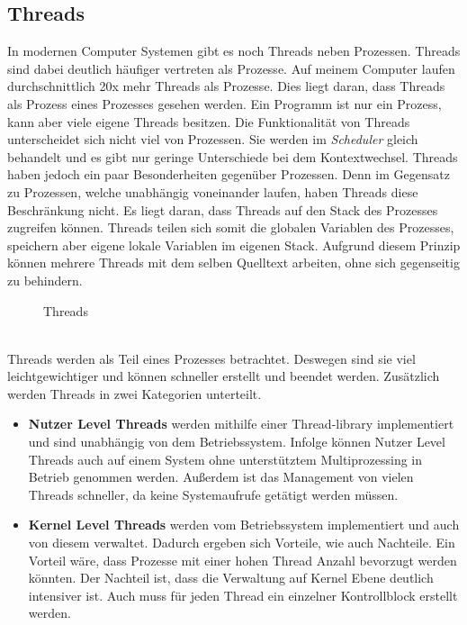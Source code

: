 \subsection{Threads}\label{Threads}
In modernen Computer Systemen gibt es noch Threads neben Prozessen. Threads sind dabei deutlich häufiger vertreten als Prozesse. Auf meinem Computer laufen durchschnittlich 20x mehr Threads als Prozesse. Dies liegt daran, dass Threads als Prozess eines Prozesses gesehen werden. Ein Programm ist nur ein Prozess, kann aber viele eigene Threads besitzen. Die Funktionalität von Threads unterscheidet sich nicht viel von Prozessen. Sie werden im \textit{Scheduler} gleich behandelt und es gibt nur geringe Unterschiede bei dem Kontextwechsel.
\medskip
\newline
Threads haben jedoch ein paar Besonderheiten gegenüber Prozessen. Denn im Gegensatz zu Prozessen, welche unabhängig voneinander laufen, haben Threads diese Beschränkung nicht. Es liegt daran, dass Threads auf den Stack des Prozesses zugreifen können. Threads teilen sich somit die globalen Variablen des Prozesses, speichern aber eigene lokale Variablen im eigenen Stack. Aufgrund diesem Prinzip können mehrere Threads mit dem selben Quelltext arbeiten, ohne sich gegenseitig zu behindern.\cite{Threads:Williams}
\begin{figure}[h]
    \centering
    
    \caption{Threads}
\end{figure}
\\Threads werden als Teil eines Prozesses betrachtet. Deswegen sind sie viel leichtgewichtiger und können schneller erstellt und beendet werden. Zusätzlich werden Threads in zwei Kategorien unterteilt.
\begin{itemize}
    \item \textbf{Nutzer Level Threads} werden mithilfe einer Thread-library implementiert und sind unabhängig von dem Betriebssystem. Infolge können Nutzer Level Threads auch auf einem System ohne unterstütztem Multiprozessing in Betrieb genommen werden. Außerdem ist das Management von vielen Threads schneller, da keine Systemaufrufe getätigt werden müssen.
    \item \textbf{Kernel Level Threads} werden vom Betriebssystem implementiert und auch von diesem verwaltet. Dadurch ergeben sich Vorteile, wie auch Nachteile. Ein Vorteil wäre, dass Prozesse mit einer hohen Thread Anzahl bevorzugt werden könnten. Der Nachteil ist, dass die Verwaltung auf Kernel Ebene deutlich intensiver ist. Auch muss für jeden Thread ein einzelner Kontrollblock erstellt werden. \cite{Threads:Dusey}
\end{itemize}
